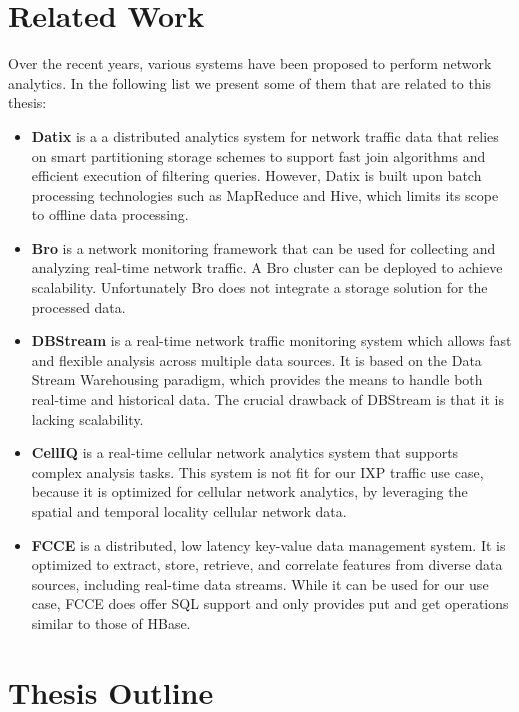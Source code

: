 \section{Related Work}

Over the recent years, various systems have been proposed to perform network analytics. In the following list we present some of them that are related to this thesis:
\begin{itemize}
\item \textbf{Datix} \cite{datix} is a a distributed analytics system for network traffic data that relies on smart partitioning storage schemes to support fast join algorithms and efficient execution of filtering queries. However, Datix is built upon batch processing technologies such as MapReduce and Hive, which limits its scope to offline data processing. 
\item \textbf{Bro} \cite{bro} is a network monitoring framework that can be used for collecting and analyzing real-time network traffic. A Bro cluster can be deployed to achieve scalability. Unfortunately Bro does not integrate a storage solution for the processed data.
\item \textbf{DBStream} \cite{dbstream} is a real-time network traffic monitoring system which allows fast and flexible analysis across multiple data sources. It is based on the Data Stream Warehousing paradigm, which provides the means to handle both real-time and historical data. The crucial drawback of DBStream is that it is lacking scalability.
\item \textbf{CellIQ} \cite{celliq} is a real-time cellular network analytics system that supports complex analysis tasks. This system is not fit for our IXP traffic use case, because it is optimized for cellular network analytics, by leveraging the spatial and temporal locality cellular network data.
\item \textbf{FCCE} \cite{fcce} is a distributed, low latency key-value data management system. It is optimized to extract, store, retrieve, and correlate features from diverse data sources, including real-time data streams. While it can be used for our use case, FCCE does offer SQL support and only provides put and get operations similar to those of HBase.
\end{itemize}


\section{Thesis Outline}

